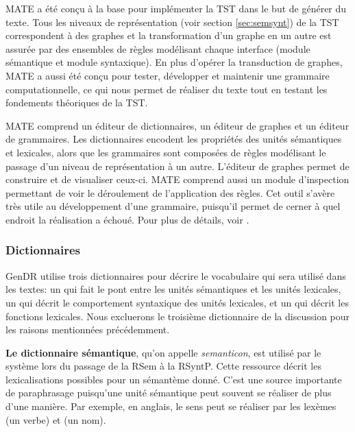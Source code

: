 MATE a été conçu à la base pour implémenter la \ac{TST} dans le but de générer du texte. Tous les niveaux de représentation (voir section \ref{sec:semsynt}) de la \ac{TST} correspondent à des graphes et la transformation d'un graphe en un autre est assurée par des ensembles de règles modélisant chaque interface (module sémantique et module syntaxique). En plus d'opérer la transduction de graphes, MATE a aussi été conçu pour tester, développer et maintenir une grammaire computationnelle, ce qui nous permet de réaliser du texte tout en testant les fondements théoriques de la \ac{TST}.

MATE comprend un éditeur de dictionnaires, un éditeur de graphes et un éditeur de grammaires. Les dictionnaires encodent les propriétés des unités sémantiques et lexicales, alors que les grammaires sont composées de règles modélisant le passage d'un niveau de représentation à un autre. L'éditeur de graphes permet de construire et de visualiser ceux-ci. MATE comprend aussi un module d'inspection permettant de voir le déroulement de l'application des règles. Cet outil s'avère très utile au développement d'une grammaire, puisqu'il permet de cerner à quel endroit la réalisation a échoué. Pour plus de détails, voir \cite{BohnetOpensourcegraph2010,LambreyImplementationcollocationspour2017,LambreyGECOv1User2016}.


\subsubsection{Dictionnaires}\label{sec:dictio}

GenDR utilise trois dictionnaires pour décrire le vocabulaire qui sera utilisé dans les textes: un qui fait le pont entre les unités sémantiques et les unités lexicales, un qui décrit le comportement syntaxique des unités lexicales, et un qui décrit les fonctions lexicales. Nous excluerons le troisième dictionnaire de la discussion pour les raisons mentionnées précédemment.

\textbf{Le dictionnaire sémantique}, qu'on appelle \emph{semanticon}, est utilisé par le système lors du passage de la \ac{RSem} à la \ac{RSyntP}. Cette ressource décrit les lexicalisations possibles pour un sémantème donné. C'est une source importante de paraphrasage puisqu'une unité sémantique peut souvent se réaliser de plus d'une manière. Par exemple, en anglais, le sens  peut se réaliser par les lexèmes  (un verbe) et  (un nom).


